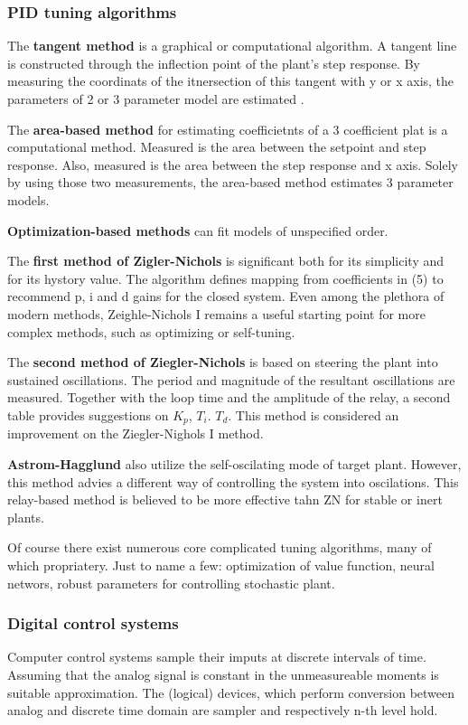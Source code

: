 \subsubsection{PID tuning algorithms}
The \textbf{tangent method} is a graphical or computational algorithm.
A tangent line is constructed through the inflection point of the plant's step response.
By measuring the coordinats of the itnersection of this tangent with y or x axis,
the parameters of 2 or 3 parameter model are estimated \cite[p. 55]{garipov}.
\par
The \textbf{area-based method} for estimating coefficietnts of a 3 coefficient plat is a computational method.
Measured is the area between the setpoint and step response.
Also, measured is the area between the step response and x axis.
Solely by using those two measurements, the area-based method estimates 3 parameter models.
\par
\textbf{Optimization-based methods} can fit models of unspecified order.
\par
The \textbf{first method of Zigler-Nichols} is significant both for its simplicity and for its hystory value.
The algorithm defines mapping from coefficients in (5) to recommend p, i and d gains for the closed system.
Even among the plethora of modern methods, Zeighle-Nichols I remains a useful starting point for more complex methods, such as optimizing or self-tuning.
\par
The \textbf{second method of Ziegler-Nichols} is based on steering the plant into sustained oscillations.
The period and magnitude of the resultant oscillations are measured.
Together with the loop time and the amplitude of the relay, a second table provides suggestions on $K_p$, $T_i$. $T_d$.
This method is considered an improvement on the Ziegler-Nighols I method.
\par
\textbf{Astrom-Hagglund} also utilize the self-oscilating mode of target plant.
However, this method advies a different way of controlling the system into oscilations.
This relay-based method is believed to be more effective tahn ZN for stable or inert plants.
\par
Of course there exist numerous core complicated tuning algorithms, many of which propriatery.
Just to name a few: optimization of value function, neural networs, robust parameters for controlling stochastic plant.

\subsubsection{Digital control systems}
Computer control systems sample their imputs\cite[p. 904]{modern-control} at discrete intervals of time.
Assuming that the analog signal is constant in the unmeasureable moments is suitable approximation.
The (logical) devices, which perform conversion between analog and discrete time domain are sampler and respectively n-th level hold.


